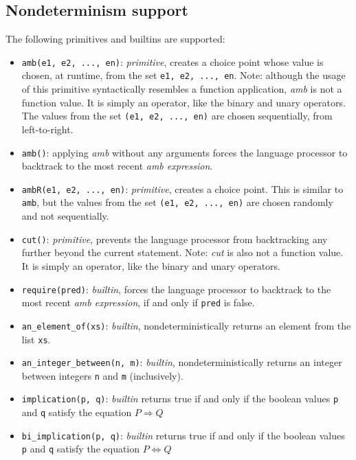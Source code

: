 \subsection*{Nondeterminism support}

The following primitives and builtins are supported:

\begin{itemize}
\item \lstinline{amb(e1, e2, ..., en)}: \textit{primitive}, creates a choice point whose value is chosen, at runtime,
from the set \lstinline{e1, e2, ..., en}. Note: although the usage of this primitive syntactically resembles a function application, \textit{amb} is not a function value. It is simply an operator, like the binary and unary operators. The values from the set \lstinline{(e1, e2, ..., en)} are chosen sequentially, from left-to-right.
\item \lstinline{amb()}: applying \textit{amb} without any arguments forces the language processor to backtrack to the most recent \textit{amb expression}.
\item \lstinline{ambR(e1, e2, ..., en)}: \textit{primitive}, creates a choice point. This is similar to \lstinline{amb}, but the values from the set \lstinline{(e1, e2, ..., en)} are chosen randomly and not sequentially.
\item \lstinline{cut()}: \textit{primitive}, prevents the language processor from backtracking any further beyond the current statement. Note: \textit{cut} is also not a function value. It is simply an operator, like the binary and unary operators.
\item \lstinline{require(pred)}: \textit{builtin}, forces the language processor to backtrack to the most recent \textit{amb expression}, if and only if \lstinline{pred} is false.
\item \lstinline{an_element_of(xs)}: \textit{builtin}, nondeterministically returns an element from the list \lstinline{xs}.
\item \lstinline{an_integer_between(n, m)}: \textit{builtin}, nondeterministically returns an integer between integers \lstinline{n} and \lstinline{m} (inclusively).
\item \lstinline{implication(p, q)}: \textit{builtin} returns true if and only if the boolean values \lstinline{p} and \lstinline{q} satisfy the equation $P \Rightarrow Q$
\item \lstinline{bi_implication(p, q)}: \textit{builtin} returns true if and only if the boolean values \lstinline{p} and \lstinline{q} satisfy the equation $P \Leftrightarrow Q$
\end{itemize}
